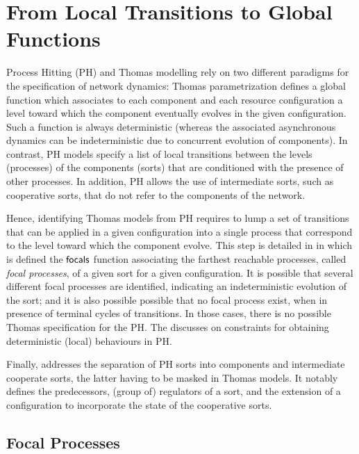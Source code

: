\section{From Local Transitions to Global Functions}\label{sec:tr2global}

Process Hitting (PH) and Thomas modelling rely on two different paradigms for the specification of
network dynamics:
Thomas parametrization defines a global function
which associates to each component and each resource configuration a level toward which the component
eventually evolves in the given configuration.
Such a function is always deterministic (whereas the associated asynchronous dynamics can be
indeterministic due to concurrent evolution of components).
In contrast, 
PH models specify a list of local transitions between the levels (processes) of the components (sorts)
that are conditioned with the presence of other processes.
In addition, PH allows the use of intermediate sorts, such as cooperative sorts, that do not refer
to the components of the network.

Hence, identifying Thomas models from PH requires to lump a set of transitions that can be
applied in a given configuration into a single process that correspond to the level toward which the
component evolve.
This step is detailed in  in which is defined the $\mathsf{focals}$ function associating 
the farthest reachable processes, called \emph{focal processes}, of a given sort
for a given configuration.
It is possible that several different focal processes are identified, indicating an indeterministic
evolution of the sort;
and it is also possible possible that no focal process exist, when in presence of terminal cycles of
transitions.
In those cases, there is no possible Thomas specification for the PH.
The  discusses on constraints for obtaining deterministic
(local) behaviours in PH.

Finally,  addresses the separation of PH sorts into
components and intermediate cooperate sorts, the latter having to be masked in Thomas models.
It notably defines the predecessors, (group of) regulators of a
sort, and the extension of a configuration to incorporate the state of the
cooperative sorts.

\subsection{Focal Processes}\label{ssec:focal}

